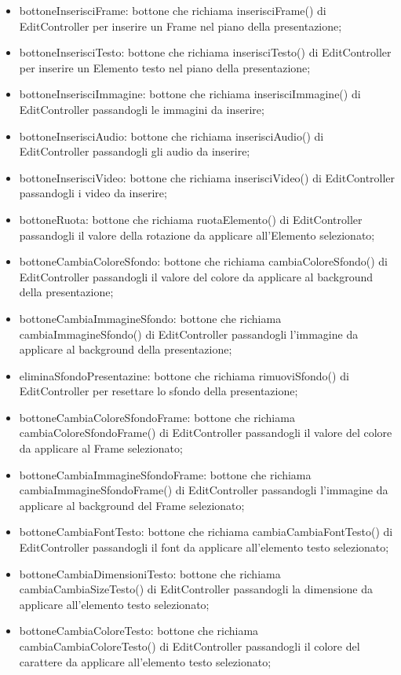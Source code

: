 {{\begin{itemize}
		\item bottoneInserisciFrame: bottone che richiama inserisciFrame() di EditController per inserire un Frame nel piano della presentazione;
		\item bottoneInserisciTesto: bottone che richiama inserisciTesto() di EditController per inserire un Elemento testo nel piano della presentazione;
		\item bottoneInserisciImmagine: bottone che richiama inserisciImmagine() di EditController passandogli le immagini da inserire;
		\item bottoneInserisciAudio: bottone che richiama inserisciAudio() di EditController passandogli gli audio da inserire;
		\item bottoneInserisciVideo: bottone che richiama inserisciVideo() di EditController passandogli i video da inserire;
		\item bottoneRuota: bottone che richiama ruotaElemento() di EditController passandogli il valore della rotazione da applicare all'Elemento selezionato;
		\item bottoneCambiaColoreSfondo: bottone che richiama cambiaColoreSfondo() di EditController passandogli il valore del colore da applicare al background della presentazione;
		\item bottoneCambiaImmagineSfondo: bottone che richiama cambiaImmagineSfondo() di EditController passandogli l'immagine da applicare al background della presentazione;
		\item eliminaSfondoPresentazine: bottone che richiama rimuoviSfondo() di EditController per resettare lo sfondo della presentazione;
		\item bottoneCambiaColoreSfondoFrame: bottone che richiama cambiaColoreSfondoFrame() di EditController passandogli il valore del colore da applicare al Frame selezionato;
		\item bottoneCambiaImmagineSfondoFrame: bottone che richiama cambiaImmagineSfondoFrame() di EditController passandogli l'immagine da applicare al background del Frame selezionato;
		\item bottoneCambiaFontTesto: bottone che richiama cambiaCambiaFontTesto() di EditController passandogli il font da applicare all'elemento testo selezionato;
		\item bottoneCambiaDimensioniTesto: bottone che richiama cambiaCambiaSizeTesto() di EditController passandogli la dimensione da applicare all'elemento testo selezionato;
		\item bottoneCambiaColoreTesto: bottone che richiama cambiaCambiaColoreTesto() di EditController passandogli il colore del carattere da applicare all'elemento testo selezionato;

\end{itemize}}}

